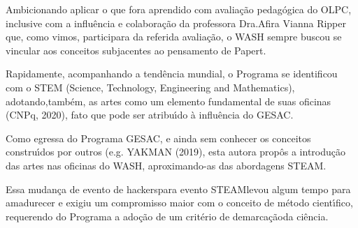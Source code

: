 \documentclass[
12pt,		%
openright,	%
twoside,  %
a4paper,			%
chapter=TITLE,		%
english,			%
french,				%
spanish,			%
brazil				%
]{USPSC-classe/USPSC}
\begin{document}
\noindent\begin{center}\mbox{\centering{}}\end{center}


Ambicionando aplicar o que fora aprendido com avalia\c{c}\~ao pedag\'ogica do OLPC, inclusive com a influ\^encia e colabora\c{c}\~ao da professora Dra.Afira Vianna Ripper que, como vimos, participara da referida avalia\c{c}\~ao, o WASH sempre buscou se vincular aos conceitos subjacentes ao pensamento de Papert.

















Rapidamente, acompanhando a tend\^encia mundial, o Programa se identificou com o STEM (Science, Technology, Engineering and Mathematics), adotando,tamb\'em, as artes como um elemento fundamental de suas oficinas  (CNPq, 2020), fato que pode ser atribu\'{\i}do \`a influ\^encia do GESAC.

















Como egressa do Programa GESAC, e ainda sem conhecer os conceitos constru\'{\i}dos por outros (e.g. YAKMAN (2019), esta autora prop\^os a introdu\c{c}\~ao das artes nas oficinas do WASH, aproximando-as das abordagens STEAM.

















Essa mudan\c{c}a de \textquotedbl evento de hackers\textquotedbl  para \textquotedbl evento STEAM\textquotedbl  levou algum tempo para amadurecer e exigiu um compromisso maior com o conceito de m\'etodo cient\'{\i}fico, requerendo do Programa a ado\c{c}\~ao de um \textquotedbl crit\'erio de demarca\c{c}\~ao\textquotedbl  da ci\^encia.
\end{document}
